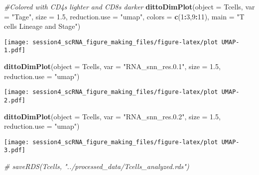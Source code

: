 \documentclass[
]{article}
\newenvironment{Shaded}{\begin{snugshade}}{\end{snugshade}}
\newcommand{\AttributeTok}[1]{\textcolor[rgb]{0.13,0.29,0.53}{#1}}
\newcommand{\CommentTok}[1]{\textcolor[rgb]{0.56,0.35,0.01}{\textit{#1}}}
\newcommand{\DecValTok}[1]{\textcolor[rgb]{0.00,0.00,0.81}{#1}}
\newcommand{\FloatTok}[1]{\textcolor[rgb]{0.00,0.00,0.81}{#1}}
\newcommand{\FunctionTok}[1]{\textcolor[rgb]{0.13,0.29,0.53}{\textbf{#1}}}
\newcommand{\NormalTok}[1]{#1}
\newcommand{\SpecialCharTok}[1]{\textcolor[rgb]{0.81,0.36,0.00}{\textbf{#1}}}
\newcommand{\StringTok}[1]{\textcolor[rgb]{0.31,0.60,0.02}{#1}}
\begin{document}
\begin{Shaded}
\begin{Highlighting}[]
\CommentTok{\#Colored with CD4s lighter and CD8s darker }
\FunctionTok{dittoDimPlot}\NormalTok{(}\AttributeTok{object =}\NormalTok{ Tcells, }
             \AttributeTok{var =}  \StringTok{"Tage"}\NormalTok{,}
             \AttributeTok{size =} \FloatTok{1.5}\NormalTok{,}
             \AttributeTok{reduction.use =} \StringTok{"umap"}\NormalTok{,}
             \AttributeTok{colors =} \FunctionTok{c}\NormalTok{(}\DecValTok{1}\SpecialCharTok{:}\DecValTok{3}\NormalTok{,}\DecValTok{9}\SpecialCharTok{:}\DecValTok{11}\NormalTok{),}
             \AttributeTok{main =} \StringTok{"T cells Lineage and Stage"}\NormalTok{)}
\end{Highlighting}
\end{Shaded}

\texttt{[image: session4\_scRNA\_figure\_making\_files/figure-latex/plot UMAP-1.pdf]}

\begin{Shaded}
\begin{Highlighting}[]
\FunctionTok{dittoDimPlot}\NormalTok{(}\AttributeTok{object =}\NormalTok{ Tcells, }
             \AttributeTok{var =}  \StringTok{"RNA\_snn\_res.0.1"}\NormalTok{,}
             \AttributeTok{size =} \FloatTok{1.5}\NormalTok{,}
             \AttributeTok{reduction.use =} \StringTok{"umap"}\NormalTok{)}
\end{Highlighting}
\end{Shaded}

\texttt{[image: session4\_scRNA\_figure\_making\_files/figure-latex/plot UMAP-2.pdf]}

\begin{Shaded}
\begin{Highlighting}[]
\FunctionTok{dittoDimPlot}\NormalTok{(}\AttributeTok{object =}\NormalTok{ Tcells, }
             \AttributeTok{var =}  \StringTok{"RNA\_snn\_res.0.2"}\NormalTok{,}
             \AttributeTok{size =} \FloatTok{1.5}\NormalTok{,}
             \AttributeTok{reduction.use =} \StringTok{"umap"}\NormalTok{)}
\end{Highlighting}
\end{Shaded}

\texttt{[image: session4\_scRNA\_figure\_making\_files/figure-latex/plot UMAP-3.pdf]}

\begin{Shaded}
\begin{Highlighting}[]
\CommentTok{\# saveRDS(Tcells, "../processed\_data/Tcells\_analyzed.rds")}
\end{Highlighting}
\end{Shaded}
\end{document}

